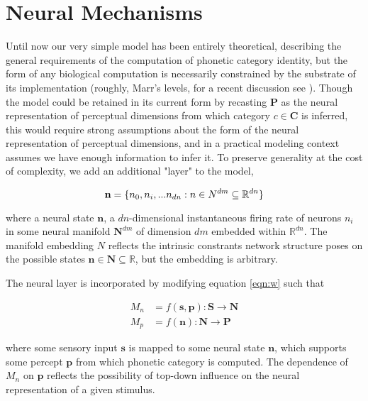 
\section{Neural Mechanisms}

Until now our very simple model has been entirely theoretical, describing the general requirements of the computation of phonetic category identity, but the form of any biological computation is necessarily constrained by the substrate of its implementation (roughly, Marr's levels, for a recent discussion see \citep{rooijTheoryTestHow2020}). Though the model could be retained in its current form by recasting $\mathbf{P}$ as the neural representation of perceptual dimensions from which category $c \in \mathbf{C}$ is inferred, this would require strong assumptions about the form of the neural representation of perceptual dimensions, and in a practical modeling context assumes we have enough information to infer it. To preserve generality at the cost of complexity, we add an additional "layer" to the model, \clearpage

\begin{equation}
\mathbf{n} = \{n_0, n_i, ... n_{dn} : n \in \mathbf \mathbf{N}^{dm} \subseteq \mathbb{R}^{dn}\}
\end{equation}

where a neural state $\mathbf{n}$, a $dn$-dimensional instantaneous firing rate of neurons $n_i$ in some neural manifold $\mathbf{N}^{dm}$ of dimension $dm$ embedded within $\mathbb{R}^{dn}$. The manifold embedding $N$ reflects the intrinsic constrants network structure poses on the possible states $\mathbf{n} \in \mathbf{N} \subseteq \mathbb{R}$, but the embedding is arbitrary.

The neural layer is incorporated by modifying equation \ref{eqn:w} such that

\begin{align}
M_n &= f(\mathbf{s}, \mathbf{p}) : \mathbf{S} \rightarrow \mathbf{N}\\
M_p &= f(\mathbf{n}) : \mathbf{N} \rightarrow \mathbf{P}
\end{align}

where some sensory input $\mathbf{s}$ is mapped to some neural state $\mathbf{n}$, which supports some percept $\mathbf{p}$ from which phonetic category is computed. The dependence of $M_n$ on $\mathbf{p}$ reflects the possibility of top-down influence on the neural representation of a given stimulus. 

